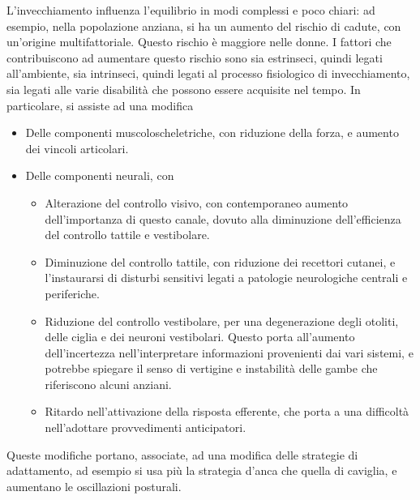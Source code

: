 L'invecchiamento influenza l'equilibrio in modi complessi e poco chiari: ad
esempio, nella popolazione anziana, si ha un aumento del rischio di cadute, con
un'origine multifattoriale. Questo rischio è maggiore nelle donne.
I fattori che contribuiscono ad aumentare questo rischio sono sia estrinseci,
quindi legati all'ambiente, sia intrinseci, quindi legati al processo
fisiologico di invecchiamento, sia legati alle varie disabilità che possono
essere acquisite nel tempo.
In particolare, si assiste ad una modifica
\begin{itemize}
\item Delle componenti muscoloscheletriche, con riduzione della forza, e aumento
dei vincoli articolari.
\item Delle componenti neurali, con
	\begin{itemize}
	\item Alterazione del controllo visivo, con contemporaneo aumento
	dell'importanza di questo canale, dovuto alla diminuzione dell'efficienza del
	controllo tattile e vestibolare.
	\item Diminuzione del controllo tattile, con riduzione dei recettori cutanei, e
	l'instaurarsi di disturbi sensitivi legati a patologie neurologiche centrali e
	periferiche.
	\item Riduzione del controllo vestibolare, per una degenerazione degli otoliti,
	delle ciglia e dei neuroni vestibolari. Questo porta all'aumento
	dell'incertezza nell'interpretare informazioni provenienti dai vari sistemi, e
	potrebbe spiegare il senso di vertigine e instabilità delle gambe che
	riferiscono alcuni anziani.
	\item Ritardo nell'attivazione della risposta efferente, che porta a una
	difficoltà nell'adottare provvedimenti anticipatori.
	\end{itemize}
\end{itemize}
Queste modifiche portano, associate, ad una modifica delle strategie di
adattamento, ad esempio si usa più la strategia d'anca che quella di caviglia,
e aumentano le oscillazioni posturali.

